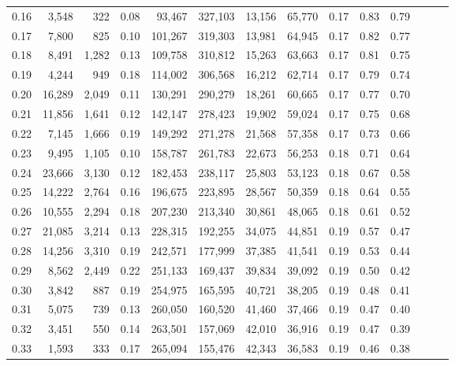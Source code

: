 \begin{tabular}{rrrrrrrrrrrrrr}
0.16 &   3,548 &    322 &  0.08 &   93,467 &  327,103 &  13,156 &  65,770 &  0.17 &  0.83 &      0.79 \\
0.17 &   7,800 &    825 &  0.10 &  101,267 &  319,303 &  13,981 &  64,945 &  0.17 &  0.82 &      0.77 \\
0.18 &   8,491 &  1,282 &  0.13 &  109,758 &  310,812 &  15,263 &  63,663 &  0.17 &  0.81 &      0.75 \\
0.19 &   4,244 &    949 &  0.18 &  114,002 &  306,568 &  16,212 &  62,714 &  0.17 &  0.79 &      0.74 \\
0.20 &  16,289 &  2,049 &  0.11 &  130,291 &  290,279 &  18,261 &  60,665 &  0.17 &  0.77 &      0.70 \\
0.21 &  11,856 &  1,641 &  0.12 &  142,147 &  278,423 &  19,902 &  59,024 &  0.17 &  0.75 &      0.68 \\
0.22 &   7,145 &  1,666 &  0.19 &  149,292 &  271,278 &  21,568 &  57,358 &  0.17 &  0.73 &      0.66 \\
0.23 &   9,495 &  1,105 &  0.10 &  158,787 &  261,783 &  22,673 &  56,253 &  0.18 &  0.71 &      0.64 \\
0.24 &  23,666 &  3,130 &  0.12 &  182,453 &  238,117 &  25,803 &  53,123 &  0.18 &  0.67 &      0.58 \\
0.25 &  14,222 &  2,764 &  0.16 &  196,675 &  223,895 &  28,567 &  50,359 &  0.18 &  0.64 &      0.55 \\
0.26 &  10,555 &  2,294 &  0.18 &  207,230 &  213,340 &  30,861 &  48,065 &  0.18 &  0.61 &      0.52 \\
0.27 &  21,085 &  3,214 &  0.13 &  228,315 &  192,255 &  34,075 &  44,851 &  0.19 &  0.57 &      0.47 \\
0.28 &  14,256 &  3,310 &  0.19 &  242,571 &  177,999 &  37,385 &  41,541 &  0.19 &  0.53 &      0.44 \\
0.29 &   8,562 &  2,449 &  0.22 &  251,133 &  169,437 &  39,834 &  39,092 &  0.19 &  0.50 &      0.42 \\
0.30 &   3,842 &    887 &  0.19 &  254,975 &  165,595 &  40,721 &  38,205 &  0.19 &  0.48 &      0.41 \\
0.31 &   5,075 &    739 &  0.13 &  260,050 &  160,520 &  41,460 &  37,466 &  0.19 &  0.47 &      0.40 \\
0.32 &   3,451 &    550 &  0.14 &  263,501 &  157,069 &  42,010 &  36,916 &  0.19 &  0.47 &      0.39 \\
0.33 &   1,593 &    333 &  0.17 &  265,094 &  155,476 &  42,343 &  36,583 &  0.19 &  0.46 &      0.38 \\

\end{tabular}
